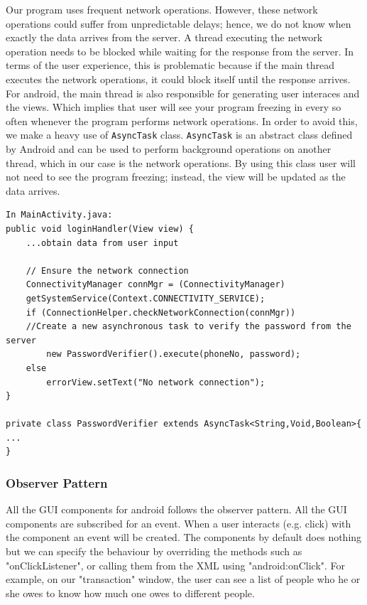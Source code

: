 \documentclass[a4paper,11pt]{article}
\begin{document}
Our program uses frequent network operations. However, these network operations could suffer from unpredictable delays; hence, we do not know when exactly the data arrives from the server. A thread executing the network operation needs to be blocked while waiting for the response from the server. In terms of the user experience, this is problematic because if the main thread executes the network operations, it could block itself until the response arrives. For android, the main thread is also responsible for generating user interaces and the views. Which implies that user will see your program freezing in every so often whenever the program performs network operations. In order to avoid this, we make a heavy use of \texttt{AsyncTask} class. \texttt{AsyncTask} is an abstract class defined by Android and can be used to perform background operations on another thread, which in our case is the network operations. By using this class user will not need to see the program freezing; instead, the view will be updated as the data arrives.     
  \begin{verbatim}
In MainActivity.java:
public void loginHandler(View view) {
    ...obtain data from user input

    // Ensure the network connection
    ConnectivityManager connMgr = (ConnectivityManager) 
    getSystemService(Context.CONNECTIVITY_SERVICE);
    if (ConnectionHelper.checkNetworkConnection(connMgr))
    //Create a new asynchronous task to verify the password from the server
        new PasswordVerifier().execute(phoneNo, password);
    else
        errorView.setText("No network connection");
}

private class PasswordVerifier extends AsyncTask<String,Void,Boolean>{
...
}
 \end{verbatim}
 
\subsubsection*{Observer Pattern}

All the GUI components for android follows the observer pattern. All the GUI components are subscribed for an event. When a user interacts (e.g. click) with the component an event will be created. The components by default does nothing but we can specify the behaviour by overriding the methods such as "onClickListener", or calling them from the XML using "android:onClick". For example, on our "transaction" window, the user can see a list of people who he or she owes to know how much one owes to different people.  
\end{document}

